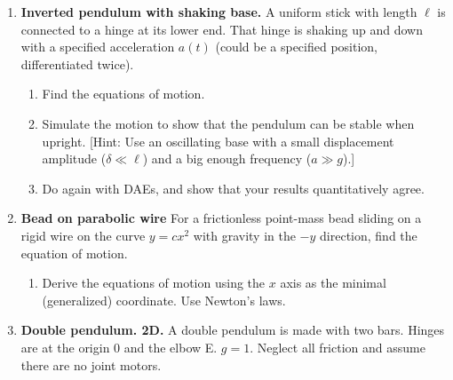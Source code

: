 \documentclass[11pt]{article}
\def\tight{ \setlength{\itemsep}{1.5pt}\setlength{\parskip}{0pt}\setlength{\parsep}{0pt}}
\begin{document}
\begin{enumerate}
  
\par
Etra:  See if you can find any other periodic solutions of the 3-body problem.
  



\item{\bf Inverted pendulum with shaking base.}  A uniform stick with length $\ell$ is
connected to a hinge at its lower end.  That hinge is shaking up and down with a specified
acceleration $a(t)$ (could be a specified position, differentiated twice).  

\begin{enumerate}
\item Find the equations of motion.
\item Simulate the motion to show that the pendulum can be stable when upright.
[Hint: Use an oscillating base with a small displacement amplitude ($\delta\ll \ell$) and a
 big enough frequency ($a\gg g$).]
 \item Do again with DAEs, and show that your results quantitatively agree.


\end{enumerate}


\item {\bf Bead on parabolic wire }\label{HWbeadonwire}
For a frictionless point-mass bead sliding on a rigid wire on the curve
$y=cx^2$ with gravity in the $-y$ direction, find the equation of motion. 

\begin{enumerate}\tight

\item Derive the equations of motion using  the $x$ axis as the minimal (generalized)
coordinate.   Use Newton's laws.

%

\end{enumerate}


\item{\bf Double pendulum. 2D.}\label{HWdoublependulum} A double pendulum is made
with two bars.  Hinges are at the origin 0 and the elbow E.    $g=1$. Neglect all friction and assume there are no joint motors.


\end{enumerate}
\end{document}
